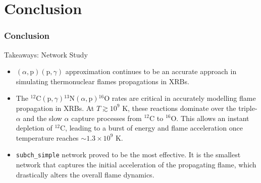 \documentclass[
	11pt, %
]{beamer}
\begin{document}
\section{Conclusion}

\begin{frame}
\frametitle{Conclusion}
    \begin{block}{Takeaways: Network Study}
    \begin{itemize}
        \item $(\alpha, \mbox{p})(\mbox{p}, \gamma)$ approximation continues to be an accurate approach in simulating thermonuclear flames propagations in XRBs. 
        
        \item The ${}^{12}\mbox{C}(\mbox{p}, \gamma) {}^{13}\mbox{N}(\alpha, \mbox{p}){}^{16}\mbox{O}$ rates are critical in accurately modelling flame propagation in XRBs. At $T \gtrsim 10^9$ K, these reactions dominate over the triple-$\alpha$ and the slow $\alpha$ capture processes from ${}^{12}$C to ${}^{16}$O. This allows an instant depletion of ${}^{12}$C, leading to a burst of energy and flame acceleration once temperature reaches $\sim 1.3 \times 10^9$ K.
    
        \item {\tt subch\_simple} network proved to be the most effective. It is the smallest network that captures the initial acceleration of the propagating flame, which drastically alters the overall flame dynamics.
    \end{itemize}
    \end{block}
    
    
\end{frame}
\end{document}
